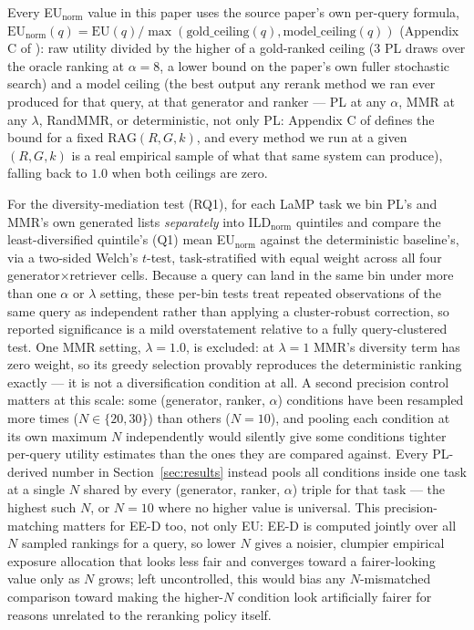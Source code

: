 \documentclass[10pt,twocolumn]{article}
\begin{document}
Every EU$_{\text{norm}}$ value in this paper uses the source paper's own per-query
formula, $\text{EU}_{\text{norm}}(q){=}\text{EU}(q)/\max(\text{gold\_ceiling}(q),
\text{model\_ceiling}(q))$ (Appendix C of \cite{eunkim2025fairrag}): raw utility
divided by the higher of a gold-ranked ceiling (3 PL draws over the oracle ranking
at $\alpha{=}8$, a lower bound on the paper's own fuller stochastic search) and a
model ceiling (the best output any rerank method we ran ever produced for that
query, at that generator and ranker --- PL at any $\alpha$, MMR at any $\lambda$,
RandMMR, or deterministic, not only PL: Appendix C of \cite{eunkim2025fairrag}
defines the bound for a fixed $\text{RAG}(R,G,k)$, and every method we run at a
given $(R,G,k)$ is a real empirical sample of what that same system can produce),
falling back to $1.0$ when both ceilings are zero.

For the diversity-mediation test (RQ1), for each LaMP task we bin PL's and MMR's own
generated lists \emph{separately} into ILD$_{\text{norm}}$ quintiles and compare the
least-diversified quintile's (Q1) mean EU$_{\text{norm}}$ against the deterministic
baseline's, via a two-sided Welch's $t$-test, task-stratified with equal weight across
all four generator$\times$retriever cells. Because a query can land in the same bin
under more than one $\alpha$ or $\lambda$ setting, these per-bin tests treat repeated
observations of the same query as independent rather than applying a cluster-robust
correction, so reported significance is a mild overstatement relative to a fully
query-clustered test. One MMR setting, $\lambda{=}1.0$, is excluded: at $\lambda{=}1$
MMR's diversity term has zero weight, so its greedy selection provably reproduces
the deterministic ranking exactly --- it is not a diversification condition at all. A second precision control matters
at this scale: some (generator, ranker, $\alpha$) conditions have been resampled more
times ($N{\in}\{20,30\}$) than others ($N{=}10$), and pooling each condition at its
own maximum $N$ independently would silently give some conditions tighter per-query
utility estimates than the ones they are compared against. Every PL-derived number in
Section~\ref{sec:results} instead pools all conditions inside one task at a single $N$
shared by every (generator, ranker, $\alpha$) triple for that task --- the highest
such $N$, or $N{=}10$ where no higher value is universal. This precision-matching
matters for EE-D too, not only EU: EE-D is computed jointly over all $N$ sampled
rankings for a query, so lower $N$ gives a noisier, clumpier empirical exposure
allocation that looks less fair and converges toward a fairer-looking value only
as $N$ grows; left uncontrolled, this would bias any $N$-mismatched comparison
toward making the higher-$N$ condition look artificially fairer for reasons
unrelated to the reranking policy itself.
\end{document}
